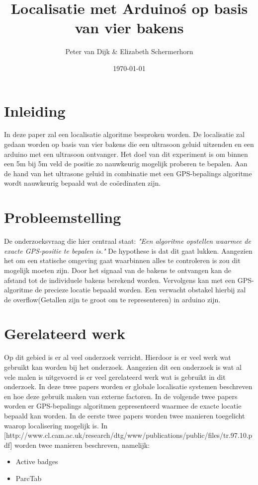 \documentclass{article}
\author{Peter van Dijk \& Elizabeth Schermerhorn}
\date{\today}
\title{Localisatie met Arduino\'s op basis van vier bakens}
\begin{document}
\maketitle
\newpage
\tableofcontents
\clearpage
\section{Inleiding}
In deze paper zal een localisatie algoritme besproken worden. De localisatie zal gedaan worden op basis van vier bakens die een ultrasoon geluid uitzenden en een arduino met een ultrasoon ontvanger. Het doel van dit experiment is om binnen een 5m bij 5m veld de positie zo nauwkeurig mogelijk proberen te bepalen. Aan de hand van het ultrasone geluid in combinatie met een GPS-bepalings algoritme wordt nauwkeurig bepaald wat de co\"{o}rdinaten zijn. 


\section{Probleemstelling}
De onderzoeksvraag die hier centraal staat: \textit{"Een algoritme opstellen waarmee de exacte GPS-positie te bepalen is."} 
De hypothese is dat dit  gaat lukken. Aangezien het om een statische omgeving gaat waarbinnen alles te controleren is zou dit mogelijk moeten zijn. Door het signaal van de bakens te ontvangen kan de afstand tot de individuele bakens berekend worden. Vervolgens kan met een GPS-algoritme de precieze locatie bepaald worden. Een verwacht obstakel hierbij zal de overflow(Getallen zijn te groot om te representeren) in arduino zijn. 

\section{Gerelateerd werk}
Op dit gebied is er al veel onderzoek verricht. Hierdoor is er veel werk wat gebruikt kan worden bij het onderzoek. Aangezien dit een onderzoek is wat al vele malen is uitgevoerd is er veel gerelateerd werk wat is gebruikt in dit onderzoek. In deze twee papers worden er globale localisatie systemen beschreven en hoe deze gebruik maken van externe factoren. In de volgende twee papers worden er GPS-bepalings algoritmen gepresenteerd waarmee de exacte locatie bepaald kan worden. In de eerste twee papers worden twee manieren toegelicht waarop localisering mogelijk is. In [http://www.cl.cam.ac.uk/research/dtg/www/publications/public/files/tr.97.10.pdf] worden twee manieren beschreven, namelijk:
\begin{itemize}
	\item Active badges
	\item ParcTab
\end{itemize}
\end{document}
